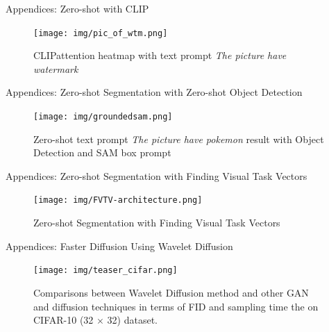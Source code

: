 \begin{frame}{Appendices: Zero-shot with CLIP}
    \begin{figure}[t]
    \centering
    \texttt{[image: img/pic\_of\_wtm.png]}
    \caption{CLIP\footnotemark attention heatmap with text prompt \textit{The picture have watermark}}
    \label{fig:pic_of_wtm}
\end{figure}
\end{frame}

\begin{frame}{Appendices: Zero-shot Segmentation with Zero-shot Object Detection}
\begin{figure}[t]
    \centering
    \texttt{[image: img/groundedsam.png]}
    \caption[Zero-shot text prompt result with Object Detection and SAM box prompt]{Zero-shot text prompt \textit{The picture have pokemon} result with Object Detection and SAM box prompt}
    \label{fig:groundedsam}
\end{figure}
\end{frame}

\begin{frame}{Appendices: Zero-shot Segmentation with Finding Visual Task Vectors}
\begin{figure}[t]
    \centering
    \texttt{[image: img/FVTV-architecture.png]}
    \caption{Zero-shot Segmentation with Finding Visual Task Vectors \footnotemark}
    \label{fig:groundedsam}
\end{figure}
\end{frame}

\begin{frame}{Appendices: Faster Diffusion Using Wavelet Diffusion}
\begin{figure}[t]
    \centering
    \texttt{[image: img/teaser\_cifar.png]}
    \caption{Comparisons between Wavelet Diffusion method and other GAN and
diffusion techniques in terms of FID and sampling time the on
CIFAR-10 (32 $\times$ 32) dataset.\footnotemark}
    \label{fig:groundedsam}
\end{figure}
\end{frame}

